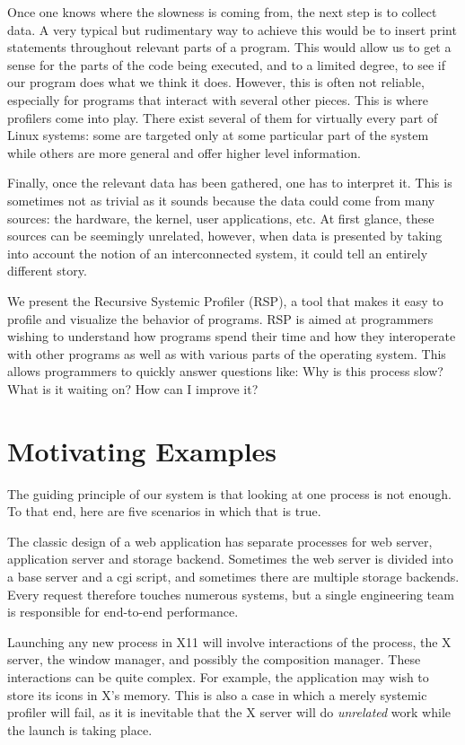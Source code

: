 \documentclass[10pt]{article}
\begin{document}
Once one knows where the slowness is coming from, the next step is to collect
data. A very typical but rudimentary way to achieve this would be to insert print
statements throughout relevant parts of a program. This would allow us to get a
sense for the parts of the code being executed, and to a limited degree, to see
if our program does what we think it does. However, this is often not reliable,
especially for programs that interact with several other pieces. This is where
profilers come into play. There exist several of them for virtually every part of
Linux systems: some are targeted only at some particular part of the system while
others are more general and offer higher level information.

Finally, once the relevant data has been gathered, one has to interpret it. This
is sometimes not as trivial as it sounds because the data could come from many
sources: the hardware, the kernel, user applications, etc. At first glance, these
sources can be seemingly unrelated, however, when data is  presented by taking
into account the notion of an interconnected system, it could tell an entirely
different story.

We present the Recursive Systemic Profiler (RSP), a tool that makes it easy to
profile and visualize the behavior of programs. RSP is aimed at programmers
wishing to understand how programs spend their time and how they interoperate
with other programs as well as with various parts of the operating system. This
allows programmers to quickly answer questions like: Why is this process slow?
What is it waiting on? How can I improve it?

\section{Motivating Examples}

The guiding principle of our system is that looking at one process is not
enough. To that end, here are five scenarios in which that is true.

The classic design of a web application has separate processes for web server,
application server and storage backend. Sometimes the web server is divided
into a base server and a cgi script, and sometimes there are multiple storage
backends. Every request therefore touches numerous systems, but a single
engineering team is responsible for end-to-end performance.

Launching any new process in X11 will involve interactions of the process, the
X server, the window manager, and possibly the composition manager. These
interactions can be quite complex. For example, the application may wish to
store its icons in X's memory. This is also a case in which a merely systemic
profiler will fail, as it is inevitable that the X server will do
\emph{unrelated} work while the launch is taking place.
\end{document}
